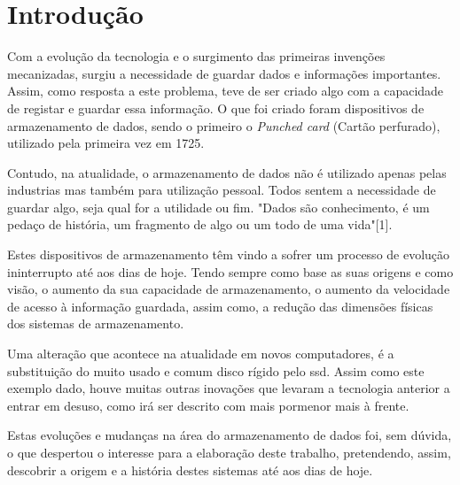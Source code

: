 \documentclass{report}
\begin{document}
\tableofcontents


\clearpage
{}

\chapter{Introdução}
\label{chap.introducao}
	Com a evolução da tecnologia e o surgimento das primeiras invenções mecanizadas, surgiu a necessidade de guardar dados e informações importantes. Assim, como resposta a este problema, teve de ser criado algo com a capacidade de registar e guardar essa informação. O que foi criado foram dispositivos de armazenamento de dados, sendo o primeiro o \textit{Punched card} (Cartão perfurado), utilizado pela primeira vez em 1725. 
\vspace{1mm}
	
	Contudo, na atualidade, o armazenamento de dados não é utilizado apenas pelas industrias mas também para utilização pessoal. Todos sentem a necessidade de guardar algo, seja qual for a utilidade ou fim. "Dados são conhecimento, é um pedaço de história, um fragmento de algo ou um todo de uma vida"[1].
\vspace{1mm}
	
	Estes dispositivos de armazenamento têm vindo a sofrer um processo de evolução ininterrupto até aos dias de hoje. Tendo sempre como base as suas origens e como visão, o aumento da sua capacidade de armazenamento, o aumento da velocidade de acesso à informação guardada, assim como, a redução das dimensões físicas dos sistemas de armazenamento.
\vspace{1mm}
	
	Uma alteração que acontece na atualidade em novos computadores, é a substituição do muito usado e comum disco rígido pelo \ac{ssd}. Assim como este exemplo dado, houve muitas outras inovações que levaram a tecnologia anterior a entrar em desuso, como irá ser descrito com mais pormenor mais à frente.
\vspace{2mm}

	Estas evoluções e mudanças na área do armazenamento de dados foi, sem dúvida, o que despertou o interesse para a elaboração deste trabalho, pretendendo, assim, descobrir a origem e a história destes sistemas até aos dias de hoje.
\vspace{2mm}
\end{document}
